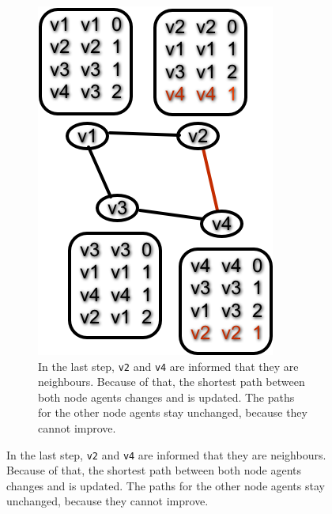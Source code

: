 \begin{figure}
\begin{subfigure}{.45\textwidth}
        \includegraphics[width=\textwidth] {images/dv5.png}
        \caption{In the last step, \texttt{v2} and \texttt{v4} are informed that they are neighbours.
                 Because of that, the shortest path between both node agents changes and is updated.
                 The paths for the other node agents stay unchanged, because they cannot improve.}
    \end{subfigure}
\end{figure}

